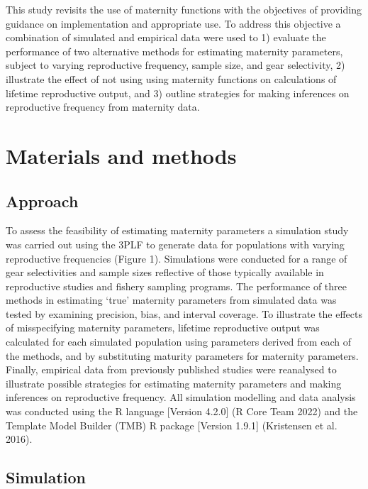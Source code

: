 \documentclass[
]{article}
\begin{document}
This study revisits the use of maternity functions with the objectives of providing guidance on implementation and appropriate use. To address this objective a combination of simulated and empirical data were used to 1) evaluate the performance of two alternative methods for estimating maternity parameters, subject to varying reproductive frequency, sample size, and gear selectivity, 2) illustrate the effect of not using using maternity functions on calculations of lifetime reproductive output, and 3) outline strategies for making inferences on reproductive frequency from maternity data.

\section{Materials and methods}\label{materials-and-methods}

\subsection{Approach}\label{approach}

To assess the feasibility of estimating maternity parameters a simulation study was carried out using the 3PLF to generate data for populations with varying reproductive frequencies (Figure 1). Simulations were conducted for a range of gear selectivities and sample sizes reflective of those typically available in reproductive studies and fishery sampling programs. The performance of three methods in estimating `true' maternity parameters from simulated data was tested by examining precision, bias, and interval coverage. To illustrate the effects of misspecifying maternity parameters, lifetime reproductive output was calculated for each simulated population using parameters derived from each of the methods, and by substituting maturity parameters for maternity parameters. Finally, empirical data from previously published studies were reanalysed to illustrate possible strategies for estimating maternity parameters and making inferences on reproductive frequency. All simulation modelling and data analysis was conducted using the R language {[}Version 4.2.0{]} (R Core Team 2022) and the Template Model Builder (TMB) R package {[}Version 1.9.1{]} (Kristensen et al. 2016).

\subsection{Simulation}\label{simulation}
\end{document}
